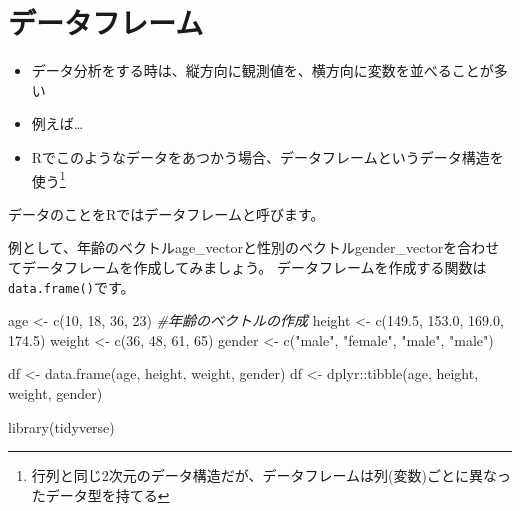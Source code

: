 \documentclass[
]{book}
\newenvironment{Shaded}{\begin{snugshade}}{\end{snugshade}}
\newcommand{\CommentTok}[1]{\textcolor[rgb]{0.56,0.35,0.01}{\textit{#1}}}
\newcommand{\DecValTok}[1]{\textcolor[rgb]{0.00,0.00,0.81}{#1}}
\newcommand{\FloatTok}[1]{\textcolor[rgb]{0.00,0.00,0.81}{#1}}
\newcommand{\FunctionTok}[1]{\textcolor[rgb]{0.00,0.00,0.00}{#1}}
\newcommand{\NormalTok}[1]{#1}
\newcommand{\OtherTok}[1]{\textcolor[rgb]{0.56,0.35,0.01}{#1}}
\newcommand{\SpecialCharTok}[1]{\textcolor[rgb]{0.00,0.00,0.00}{#1}}
\newcommand{\StringTok}[1]{\textcolor[rgb]{0.31,0.60,0.02}{#1}}
\begin{document}
\hypertarget{ux30c7ux30fcux30bfux30d5ux30ecux30fcux30e0-1}{%
\section*{データフレーム}\label{ux30c7ux30fcux30bfux30d5ux30ecux30fcux30e0-1}}

\begin{itemize}
\item
  データ分析をする時は、縦方向に観測値を、横方向に変数を並べることが多い
\item
  例えば\ldots{}
\item
  Rでこのようなデータをあつかう場合、データフレームというデータ構造を使う\footnote{行列と同じ2次元のデータ構造だが、データフレームは列(変数)ごとに異なったデータ型を持てる}
\end{itemize}

データのことをRではデータフレームと呼びます。

例として、年齢のベクトルage\_vectorと性別のベクトルgender\_vectorを合わせてデータフレームを作成してみましょう。 データフレームを作成する関数は\texttt{data.frame()}です。

\begin{Shaded}
\begin{Highlighting}[]
\NormalTok{age }\OtherTok{\textless{}{-}} \FunctionTok{c}\NormalTok{(}\DecValTok{10}\NormalTok{, }\DecValTok{18}\NormalTok{, }\DecValTok{36}\NormalTok{, }\DecValTok{23}\NormalTok{) }\CommentTok{\#年齢のベクトルの作成}
\NormalTok{height }\OtherTok{\textless{}{-}} \FunctionTok{c}\NormalTok{(}\FloatTok{149.5}\NormalTok{, }\FloatTok{153.0}\NormalTok{, }\FloatTok{169.0}\NormalTok{, }\FloatTok{174.5}\NormalTok{)}
\NormalTok{weight }\OtherTok{\textless{}{-}} \FunctionTok{c}\NormalTok{(}\DecValTok{36}\NormalTok{, }\DecValTok{48}\NormalTok{, }\DecValTok{61}\NormalTok{, }\DecValTok{65}\NormalTok{)}
\NormalTok{gender }\OtherTok{\textless{}{-}} \FunctionTok{c}\NormalTok{(}\StringTok{"male"}\NormalTok{, }\StringTok{"female"}\NormalTok{, }\StringTok{"male"}\NormalTok{, }\StringTok{"male"}\NormalTok{) }

\NormalTok{df }\OtherTok{\textless{}{-}} \FunctionTok{data.frame}\NormalTok{(age, height, weight, gender)}
\NormalTok{df }\OtherTok{\textless{}{-}}\NormalTok{ dplyr}\SpecialCharTok{::}\FunctionTok{tibble}\NormalTok{(age, height, weight, gender)}

\FunctionTok{library}\NormalTok{(tidyverse)}
\end{Highlighting}
\end{Shaded}
\end{document}
